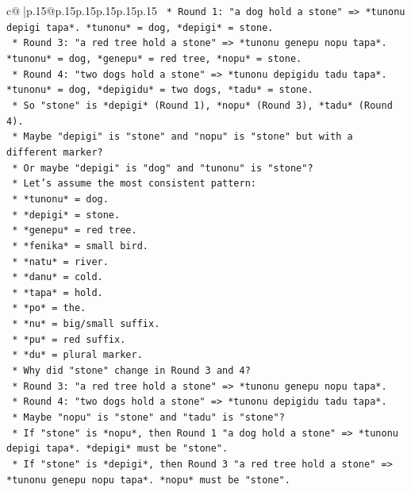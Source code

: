 \documentclass{article}
\begin{document}
{\begin{supertabular}{c@{$\;$}|p{.15\linewidth}@{}p{.15\linewidth}p{.15\linewidth}p{.15\linewidth}p{.15\linewidth}p{.15\linewidth}}
{{{\texttt{        *   Round 1: "a dog hold a stone" => *tunonu depigi tapa*. *tunonu* = dog, *depigi* = stone.} \\
\texttt{        *   Round 3: "a red tree hold a stone" => *tunonu genepu nopu tapa*. *tunonu* = dog, *genepu* = red tree, *nopu* = stone.} \\
\texttt{        *   Round 4: "two dogs hold a stone" => *tunonu depigidu tadu tapa*. *tunonu* = dog, *depigidu* = two dogs, *tadu* = stone.} \\
\texttt{        *   So "stone" is *depigi* (Round 1), *nopu* (Round 3), *tadu* (Round 4).} \\
\texttt{        *   Maybe "depigi" is "stone" and "nopu" is "stone" but with a different marker?} \\
\texttt{        *   Or maybe "depigi" is "dog" and "tunonu" is "stone"?} \\
\texttt{        *   Let's assume the most consistent pattern:} \\
\texttt{        *   *tunonu* = dog.} \\
\texttt{        *   *depigi* = stone.} \\
\texttt{        *   *genepu* = red tree.} \\
\texttt{        *   *fenika* = small bird.} \\
\texttt{        *   *natu* = river.} \\
\texttt{        *   *danu* = cold.} \\
\texttt{        *   *tapa* = hold.} \\
\texttt{        *   *po* = the.} \\
\texttt{        *   *nu* = big/small suffix.} \\
\texttt{        *   *pu* = red suffix.} \\
\texttt{        *   *du* = plural marker.} \\
\texttt{        *   Why did "stone" change in Round 3 and 4?} \\
\texttt{        *   Round 3: "a red tree hold a stone" => *tunonu genepu nopu tapa*.} \\
\texttt{        *   Round 4: "two dogs hold a stone" => *tunonu depigidu tadu tapa*.} \\
\texttt{        *   Maybe "nopu" is "stone" and "tadu" is "stone"?} \\
\texttt{        *   If "stone" is *nopu*, then Round 1 "a dog hold a stone" => *tunonu depigi tapa*. *depigi* must be "stone".} \\
\texttt{        *   If "stone" is *depigi*, then Round 3 "a red tree hold a stone" => *tunonu genepu nopu tapa*. *nopu* must be "stone".} \\
}}}
\end{supertabular}}
\end{document}

